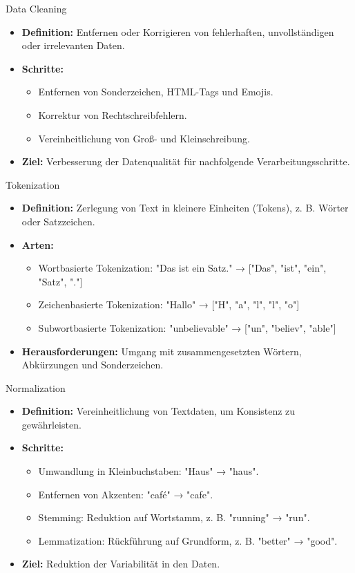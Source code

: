 \documentclass[aspectratio=1610, xcolor=dvipsnames, 9pt]{beamer}
\begin{document}
\begin{frame}{Data Cleaning}
  \begin{itemize}
    \item \textbf{Definition:} Entfernen oder Korrigieren von fehlerhaften, unvollständigen oder irrelevanten Daten.
    \item \textbf{Schritte:}
      \begin{itemize}
        \item Entfernen von Sonderzeichen, HTML-Tags und Emojis.
        \item Korrektur von Rechtschreibfehlern.
        \item Vereinheitlichung von Groß- und Kleinschreibung.
      \end{itemize}
    \item \textbf{Ziel:} Verbesserung der Datenqualität für nachfolgende Verarbeitungsschritte.
  \end{itemize}
\end{frame}

\begin{frame}{Tokenization}
  \begin{itemize}
    \item \textbf{Definition:} Zerlegung von Text in kleinere Einheiten (Tokens), z. B. Wörter oder Satzzeichen.
    \item \textbf{Arten:}
      \begin{itemize}
        \item Wortbasierte Tokenization: "Das ist ein Satz." → ["Das", "ist", "ein", "Satz", "."]
        \item Zeichenbasierte Tokenization: "Hallo" → ["H", "a", "l", "l", "o"]
        \item Subwortbasierte Tokenization: "unbelievable" → ["un", "believ", "able"]
      \end{itemize}
    \item \textbf{Herausforderungen:} Umgang mit zusammengesetzten Wörtern, Abkürzungen und Sonderzeichen.
  \end{itemize}
\end{frame}

\begin{frame}{Normalization}
  \begin{itemize}
    \item \textbf{Definition:} Vereinheitlichung von Textdaten, um Konsistenz zu gewährleisten.
    \item \textbf{Schritte:}
      \begin{itemize}
        \item Umwandlung in Kleinbuchstaben: "Haus" → "haus".
        \item Entfernen von Akzenten: "café" → "cafe".
        \item Stemming: Reduktion auf Wortstamm, z. B. "running" → "run".
        \item Lemmatization: Rückführung auf Grundform, z. B. "better" → "good".
      \end{itemize}
    \item \textbf{Ziel:} Reduktion der Variabilität in den Daten.
  \end{itemize}
\end{frame}
\end{document}
